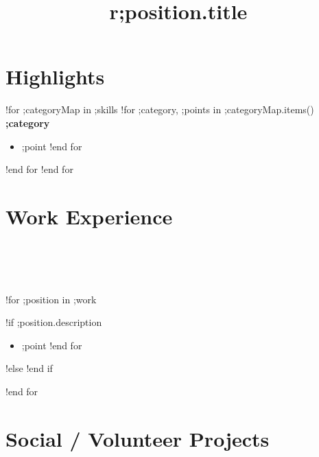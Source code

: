 \documentclass[margin,line]{res}
\begin{document}
\begin{sloppypar} %

\address{;contact.url\hspace{1cm};contact.phone\hspace{1cm};contact.email}

\begin{resume}

\section{Highlights}
!for ;categoryMap in ;skills
    !for ;category, ;points in ;categoryMap.items()
        {\bf ;category}
        \begin{itemize}
        !for ;point in ;points
            \item ;point
        !end for
        \end{itemize}
    !end for
!end for


\section {Work Experience}

\begin{format}
  \title{r}\\
  \\
  \body\\
\end{format}

!for ;position in ;work
    \title{;position.title}
    \begin{position}
        \vspace{-.3cm}
        !if ;position.description
            \begin{itemize}
            !for ;point in ;position.description
                \item ;point
            !end for
            \end{itemize}
        !else
            \vspace{-.2cm}
        !end if
    \end{position}
!end for

\section {Social / Volunteer Projects}


\end{resume}
\end{sloppypar}
\end{document}
